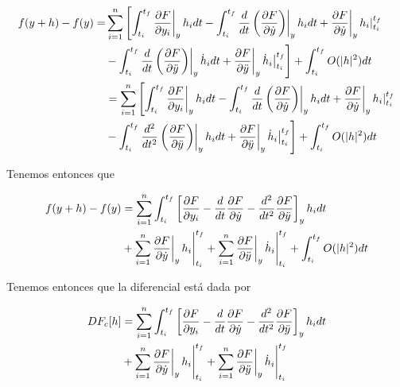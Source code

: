 \documentclass[a4paper,10pt]{article}
\numberwithin{equation}{section}
\newcommand{\zerodel}{.\kern-\nulldelimiterspace}
\begin{document}
\begin{align}
 \begin{split}
  f(y+h) - f(y) =  &\sum_{i=1}^n \left[\int_{t_{i}}^{t_{f}}\left\zerodel\frac{\partial F}{\partial y_i}\right|_y h_i dt 
   - \int_{t_{i}}^{t_{f}} \frac{d}{dt}\left(\left\zerodel\frac{\partial F}{\partial \dot{y}}\right)\right|_y h_i dt + 
  \left\zerodel\frac{\partial F}{\partial \dot{y}}\right|_y \left\zerodel h_i\right|_{t_{i}}^{t_{f}}\right\zerodel \\
  &- \left\zerodel\int_{t_{i}}^{t_{f}} \frac{d}{dt}\left(\left\zerodel\frac{\partial F}{\partial \ddot{y}}\right)\right|_y \dot{h}_i dt + 
  \left\zerodel\frac{\partial F}{\partial \ddot{y}}\right|_y \left\zerodel \dot{h}_i\right|_{t_{i}}^{t_{f}}\right]
  +  \int_{t_{i}}^{t_{f}} O(|h|^2)dt \\
  &= \sum_{i=1}^n\left[\int_{t_{i}}^{t_{f}}\left\zerodel\frac{\partial F}{\partial y_i}\right|_y h_i dt 
   - \int_{t_{i}}^{t_{f}} \frac{d}{dt}\left(\left\zerodel\frac{\partial F}{\partial \dot{y}}\right)\right|_y h_i dt + 
  \left\zerodel\frac{\partial F}{\partial \dot{y}}\right|_y \left\zerodel h_i\right|_{t_{i}}^{t_{f}}\right\zerodel \\
  &-\left\zerodel \int_{t_{i}}^{t_{f}} \frac{d^2}{dt^2}\left(\left\zerodel\frac{\partial F}{\partial \ddot{y}}\right)\right|_y h_i dt + 
  \left\zerodel\frac{\partial F}{\partial \ddot{y}}\right|_y \left\zerodel \dot{h}_i\right|_{t_{i}}^{t_{f}}\right]
  +  \int_{t_{i}}^{t_{f}} O(|h|^2)dt
 \end{split}
\end{align}

Tenemos entonces que 

\begin{align*}
 f(y+h) - f(y) &= \sum_{i=1}^n \int_{t_{i}}^{t_{f}} \left[\frac{\partial F}{\partial y_i}  - 
 \frac{d}{dt}\frac{\partial F}{\partial \dot{y}}  
 - \frac{d^2}{dt^2}\frac{\partial F}{\partial \ddot{y}} \right]_y h_i dt \\
 &+\sum_{i=1}^n \left\zerodel \left\zerodel\frac{\partial F}{\partial \dot{y}}\right|_y h_i\right|_{t_{i}}^{t_{f}}
 + \sum_{i=1}^n \left\zerodel \left\zerodel\frac{\partial F}{\partial \ddot{y}}\right|_y\dot{h}_i\right|_{t_{i}}^{t_{f}}
 + \int_{t_{i}}^{t_{f}} O(|h|^2)dt
\end{align*}

Tenemos entonces que la diferencial está dada por

\begin{align}
\begin{split}
 DF_c[h] &=  \sum_{i=1}^n \int_{t_{i}}^{t_{f}} \left[\frac{\partial F}{\partial y_i}  - 
 \frac{d}{dt}\frac{\partial F}{\partial \dot{y}}  
 - \frac{d^2}{dt^2}\frac{\partial F}{\partial \ddot{y}} \right]_y h_i dt \\
 &+\sum_{i=1}^n \left\zerodel \left\zerodel\frac{\partial F}{\partial \dot{y}}\right|_y h_i\right|_{t_{i}}^{t_{f}}
 + \sum_{i=1}^n \left\zerodel \left\zerodel\frac{\partial F}{\partial \ddot{y}}\right|_y\dot{h}_i\right|_{t_{i}}^{t_{f}}
 \end{split}
 \label{eq:diferencialFuncional2}
\end{align}
\end{document}
